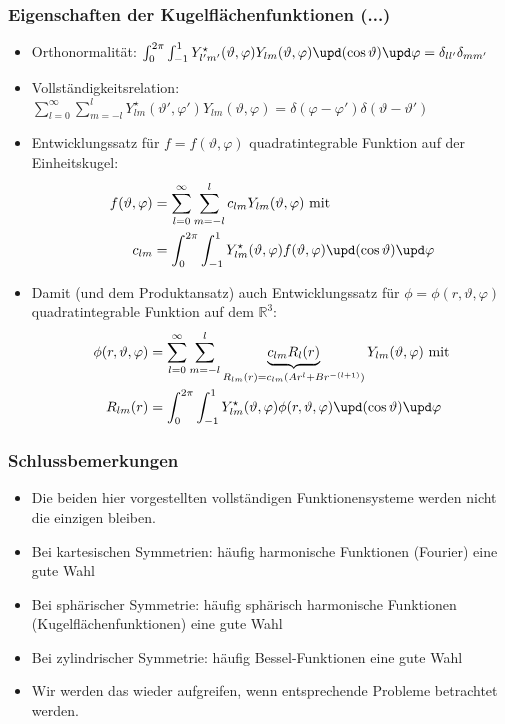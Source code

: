       \begin{frame}
        \frametitle{Eigenschaften der Kugelflächenfunktionen (...)}
        \begin{itemize}[<+->]
        \item Orthonormalität:
          $
          \int_0^{2\pi}\int_{-1}^1  Y_{l'm'}^\star(\vartheta,\varphi) Y_{lm}(\vartheta,\varphi)\upd(\cos\vartheta)\upd\varphi = \delta_{ll'}\delta_{mm'} 
          $
        \item Vollständigkeitsrelation:
          $
          \sum_{l=0}^{\infty}\sum_{m=-l}^l  Y_{lm}^\star(\vartheta',\varphi') Y_{lm}(\vartheta,\varphi) = \delta(\varphi-\varphi')\delta(\vartheta-\vartheta') 
          $
        \item Entwicklungssatz für $f=f(\vartheta,\varphi)$ quadratintegrable Funktion auf der Einheitskugel:
          \begin{align*}
            f(\vartheta,\varphi) &= \sum_{l=0}^{\infty}\sum_{m=-l}^l  c_{lm} Y_{lm}(\vartheta,\varphi) \text{ mit}\\
c_{lm} & = \int_0^{2\pi}\int_{-1}^1  Y_{lm}^\star(\vartheta,\varphi) f(\vartheta,\varphi) \upd(\cos\vartheta)\upd\varphi            
          \end{align*}
        \item Damit (und dem Produktansatz) auch Entwicklungssatz für $\phi=\phi(r, \vartheta,\varphi)$ quadratintegrable Funktion auf dem $\mathbb{R}^3$:
          \begin{align*}
            \phi(r, \vartheta,\varphi) &= \sum_{l=0}^{\infty}\sum_{m=-l}^l  \underbrace{c_{lm} R_l(r)}_{R_{lm}(r)=c_{lm}(A r^l+ B r^{-(l+1)})} Y_{lm}(\vartheta,\varphi) \text{ mit}\\
R_{lm}(r) & = \int_0^{2\pi}\int_{-1}^1  Y_{lm}^\star(\vartheta,\varphi) \phi(r,\vartheta,\varphi) \upd(\cos\vartheta)\upd\varphi            
          \end{align*}

        \end{itemize}
\end{frame}      

\begin{frame}
  \frametitle{Schlussbemerkungen}
  \begin{itemize}[<+->]
  \item Die beiden hier vorgestellten vollständigen Funktionensysteme werden nicht die einzigen bleiben.
  \item Bei kartesischen Symmetrien: häufig \alert{harmonische Funktionen} (Fourier) eine gute Wahl
  \item Bei sphärischer Symmetrie: häufig \alert{sphärisch harmonische Funktionen} (Kugelflächenfunktionen) eine gute Wahl
  \item Bei zylindrischer Symmetrie: häufig \alert{Bessel-Funktionen} eine gute Wahl
    \item Wir werden das wieder aufgreifen, wenn entsprechende Probleme betrachtet werden.
    \end{itemize}
\end{frame}



   
